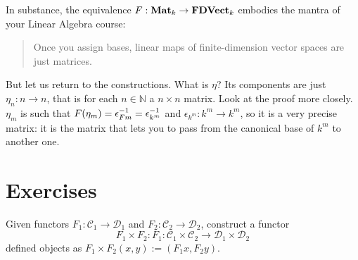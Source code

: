 \begin{example}
  In substance, the equivalence \(F : \mathbf{Mat}_k \to \mathbf{FDVect}_k\) embodies the
  mantra of your {\sc Linear Algebra} course:
  \begin{quote}
    Once you assign bases, linear maps of finite-dimension vector spaces
    are just matrices.
  \end{quote}

  But let us return to the constructions. What is \(\eta\)? Its components
  are just \(\eta_n : n \to n\), that is for each \(n \in \mathbb{N}\) a
  \(n \times n\) matrix. Look at the proof more closely. \(\eta_m\) is such that
  \(F(\eta_m) = \epsilon^{-1}_{Fm} = \epsilon^{-1}_{k^m}\) and
  \(\epsilon_{k^m} : k^m \to k^m\), so it is a very precise matrix: it is the
  matrix that lets you to pass from the canonical base of \(k^m\) to
  another one.
\end{example}



\section{Exercises}

\begin{exercise}
  Given functors \(F_1 : \mathcal{C}_1 \to \mathcal{D}_1\) and \(F_2 : \mathcal{C}_2 \to \mathcal{D}_2\), construct
  a functor
  \[
    F_1 \times F_2 : F_1 : \mathcal{C}_1 \times \mathcal{C}_2 \to \mathcal{D}_1 \times \mathcal{D}_2
  \]
  defined objects as \(F_1 \times F_2 (x, y) := \left( F_1 x, F_2 y \right)\).
\end{exercise}

